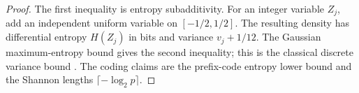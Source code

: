 \begin{proof}
The first inequality is entropy subadditivity. For an integer variable
$Z_j$, add an independent uniform variable on $[-1/2,1/2]$.
The resulting density has differential entropy $H(Z_j)$ in bits and
variance $v_j+1/12$. The Gaussian maximum-entropy bound gives the
second inequality; this is the classical discrete variance bound
\citep{massey1988}. The coding claims are the prefix-code entropy
lower bound and the Shannon lengths $\lceil-\log_2p\rceil$.
\end{proof}
